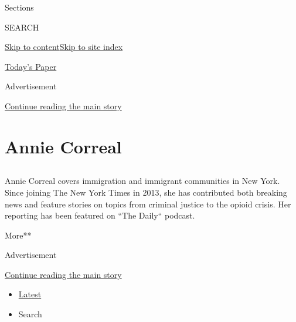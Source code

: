 Sections

SEARCH

\protect\hyperlink{site-content}{Skip to
content}\protect\hyperlink{site-index}{Skip to site index}

\href{https://myaccount.nytimes3xbfgragh.onion/auth/login?response_type=cookie\&client_id=vi}{}

\href{https://www.nytimes3xbfgragh.onion/section/todayspaper}{Today's
Paper}

Advertisement

\protect\hyperlink{after-top}{Continue reading the main story}

\hypertarget{annie-correal}{%
\section{Annie Correal}\label{annie-correal}}

\subsection{}

Annie Correal covers immigration and immigrant communities in New York.
Since joining The New York Times in 2013, she has contributed both
breaking news and feature stories on topics from criminal justice to the
opioid crisis. Her reporting has been featured on ``The Daily`` podcast.

More**

Advertisement

\protect\hyperlink{after-mid1}{Continue reading the main story}

\begin{itemize}
\tightlist
\item
  \protect\hyperlink{stream-panel}{Latest}
\item
  Search
\end{itemize}

